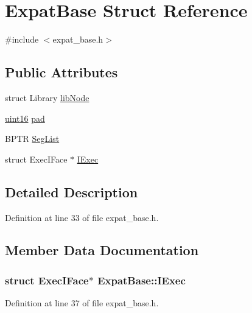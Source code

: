 \hypertarget{struct_expat_base}{}\section{Expat\+Base Struct Reference}
\label{struct_expat_base}


{\ttfamily \#include $<$expat\+\_\+base.\+h$>$}

\subsection*{Public Attributes}
\begin{DoxyCompactItemize}
\item 
struct Library \hyperlink{struct_expat_base_ab34967762b8740d647d952d13f14b0aa}{lib\+Node}
\item 
\hyperlink{cppext_8h_a05f6b0ae8f6a6e135b0e290c25fe0e4e}{uint16} \hyperlink{struct_expat_base_a4fccec5b6c3957501a235dc809fbf396}{pad}
\item 
B\+P\+TR \hyperlink{struct_expat_base_adbbfd90e7b769472dda209586f316a1c}{Seg\+List}
\item 
struct Exec\+I\+Face $\ast$ \hyperlink{struct_expat_base_aa171c7c2ed1e08131edda0a5ec70feb0}{I\+Exec}
\end{DoxyCompactItemize}


\subsection{Detailed Description}


Definition at line 33 of file expat\+\_\+base.\+h.



\subsection{Member Data Documentation}
\subsubsection[{\texorpdfstring{I\+Exec}{IExec}}]{\setlength{\rightskip}{0pt plus 5cm}struct Exec\+I\+Face$\ast$ Expat\+Base\+::\+I\+Exec}\hypertarget{struct_expat_base_aa171c7c2ed1e08131edda0a5ec70feb0}{}\label{struct_expat_base_aa171c7c2ed1e08131edda0a5ec70feb0}


Definition at line 37 of file expat\+\_\+base.\+h.

